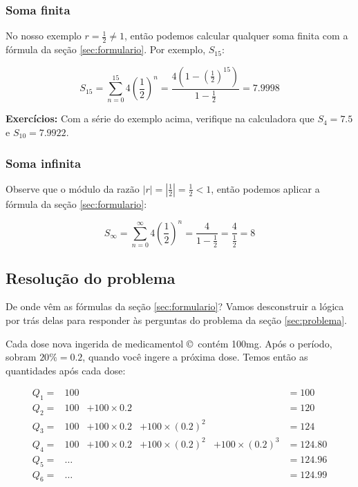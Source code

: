 \documentclass[a4paper]{article}
\begin{document}
\subsubsection{Soma finita}

No nosso exemplo $r = \frac{1}{2} \ne 1$, então podemos calcular
qualquer soma finita com a fórmula da seção \ref{sec:formulario}. Por
exemplo, $S_{15}$:

\begin{displaymath}
  S_{15} = \sum_{n=0}^{15} 4\left(\frac{1}{2}\right)^n =
  \frac{4\left(1-\left(\frac{1}{2}\right)^{15}\right)}{1-\frac{1}{2}} = 7.9998
\end{displaymath}

{\bf Exercícios:} Com a série do exemplo acima, verifique na
calculadora que $S_4=7.5$ e $S_{10}=7.9922$.

\subsubsection{Soma infinita}

Observe que o módulo da razão
$|r|=\left|\frac{1}{2}\right|=\frac{1}{2} <1$, então podemos aplicar a
fórmula da seção \ref{sec:formulario}:

\begin{displaymath}
  S_\infty = \sum_{n=0}^\infty 4\left(\frac{1}{2}\right)^n =
  \frac{4}{1-\frac{1}{2}} = \frac{4}{\frac{1}{2}} = 8
\end{displaymath}

\subsection{Resolução do problema}

De onde vêm as fórmulas da seção \ref{sec:formulario}? Vamos
desconstruir a lógica por trás delas para responder às perguntas do
problema da seção \ref{sec:problema}.

Cada dose nova ingerida de medicamentol \copyright\ contém 100mg. Após
o período, sobram $20\%=0.2$, quando você ingere a próxima dose. Temos
então as quantidades após cada dose:

\begin{displaymath}
  \begin{array}{cccccl}
    Q_1=&100&&&&=100 \\
    Q_2=&100&+100\times 0.2&&&=120 \\
    Q_3=&100&+100\times 0.2&+100\times (0.2)^2&&=124\\
    Q_4=&100&+100\times 0.2&+100\times (0.2)^2&+100\times(0.2)^3&=124.80 \\
    Q_5=&\ldots &&&&=124.96\\
    Q_6=&\ldots&&&&=124.99
  \end{array}
\end{displaymath}
\end{document}
